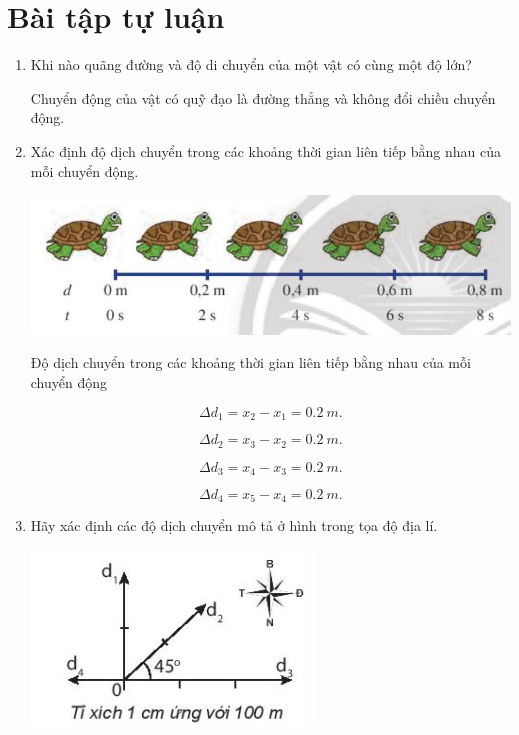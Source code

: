 \section{Bài tập tự luận}
\begin{enumerate}[label=\bfseries Bài \arabic*:]
	\item {}
	
	
	{
		Khi nào quãng đường và độ di chuyển của một vật có cùng một độ lớn?
	}
	
	\hideall
	{	Chuyển động của vật có quỹ đạo là đường thẳng và không đổi chiều chuyển động.
	}

	\item {}
	
	
	{
		Xác định độ dịch chuyển trong các khoảng thời gian liên tiếp bằng nhau của mỗi chuyển động.
		
		\begin{center}
			\includegraphics[scale=0.6]{../figs/VN10-2022-PH-TP004-6.jpg}
		\end{center}
	}
	
	\hideall
	{	
		
		Độ dịch chuyển trong các khoảng thời gian liên tiếp bằng nhau của mỗi chuyển động
		
		$$\Delta d_1 = x_2 - x_1 = \SI{0,2}{m}.$$
		
		$$\Delta d_2 = x_3 - x_2 = \SI{0,2}{m}.$$
		
		$$\Delta d_3 = x_4 - x_3 = \SI{0,2}{m}.$$
		
		$$\Delta d_4 = x_5 - x_4 = \SI{0,2}{m}.$$
		
	}


	\item {}
	
	
	{
		Hãy xác định các độ dịch chuyển mô tả ở hình trong tọa độ địa lí.
		
		\begin{center}
			\includegraphics[scale=1]{../figs/VN10-2022-PH-TP004-2.jpg}
		\end{center}
	}
	

\end{enumerate}
